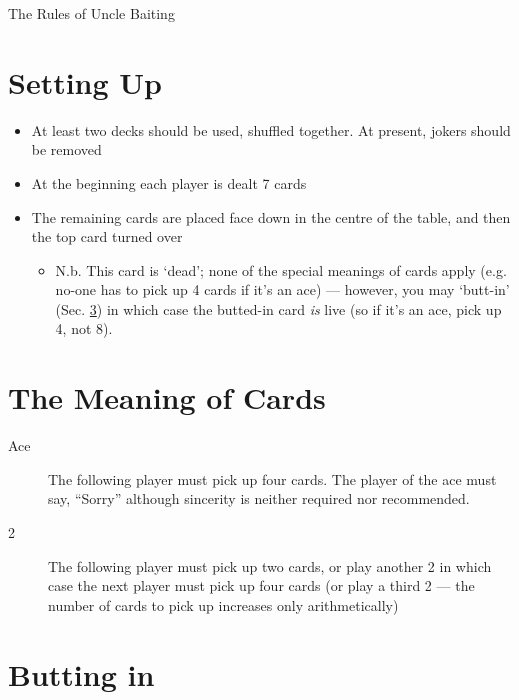 \documentclass[12pt]{article}
\newcommand{\Sec}[1]{Sec. \ref{#1}}
\begin{document}
\begin{center}
  \large The Rules of Uncle Baiting
\end{center}



\section{Setting Up}

\begin{itemize}
\item At least two decks should be used, shuffled together.  At present, jokers should be removed
  
\item At the beginning each player is dealt 7 cards
  
\item The remaining cards are placed face down in the centre of the table, and then the
  top card turned over

  \begin{itemize}
    \item N.b. This card is `dead'; none of the special meanings of cards apply (e.g.
      no-one has to pick up 4 cards if it's an ace) --- however, you 
      may `butt-in' (\Sec{buttingIn}) in which case the butted-in card \textit{is}
      live (so if it's an ace, pick up 4, not 8).
  \end{itemize}
\end{itemize}

\section{The Meaning of Cards}

\begin{description}
\item[Ace]
  The following player must pick up four cards.  The player of the ace must say, ``Sorry'' although sincerity is neither required nor recommended.

  \item[2]
    The following player must pick up two cards, or play another 2 in which case the next player must
    pick up four cards (or play a third 2 --- the number of cards to pick up increases only arithmetically)

\end{description}

\section{Butting in}
\label{buttingIn}
\end{document}
